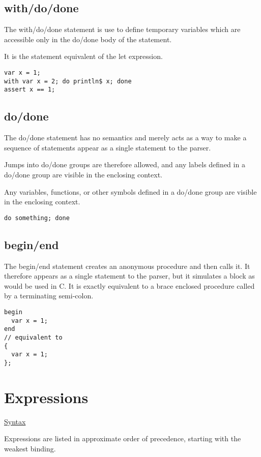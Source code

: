 \documentclass[oneside]{book}
\begin{document}
\section{with/do/done}
The with/do/done statement is use to define temporary variables
which are accessible only in the do/done body of the statement.

It is the statement equivalent of the let expression.

\begin{verbatim}
var x = 1;
with var x = 2; do println$ x; done
assert x == 1;
\end{verbatim}


\section{do/done}
The do/done statement has no semantics and merely acts as a
way to make a sequence of statements appear as a single
statement to the parser.

Jumps into do/done groups are therefore allowed, and
any labels defined in a do/done group are visible in
the enclosing context.

Any variables, functions, or other symbols defined in a do/done
group are visible in the enclosing context.

\begin{verbatim}
do something; done
\end{verbatim}


\section{begin/end}
The begin/end statement creates an anonymous procedure
and then calls it. It therefore appears as a single statement
to the parser, but it simulates a block as would be used in C.
It is exactly equivalent to a brace enclosed procedure called
by a terminating semi-colon.

\begin{verbatim}
begin
  var x = 1;
end
// equivalent to
{
  var x = 1;
};
\end{verbatim}


\chapter{Expressions}
\href{http://felix-lang.org/share/lib/grammar/expressions.fsyn}{Syntax}

Expressions are listed in approximate order of precedence,
starting with the weakest binding.
\end{document}
